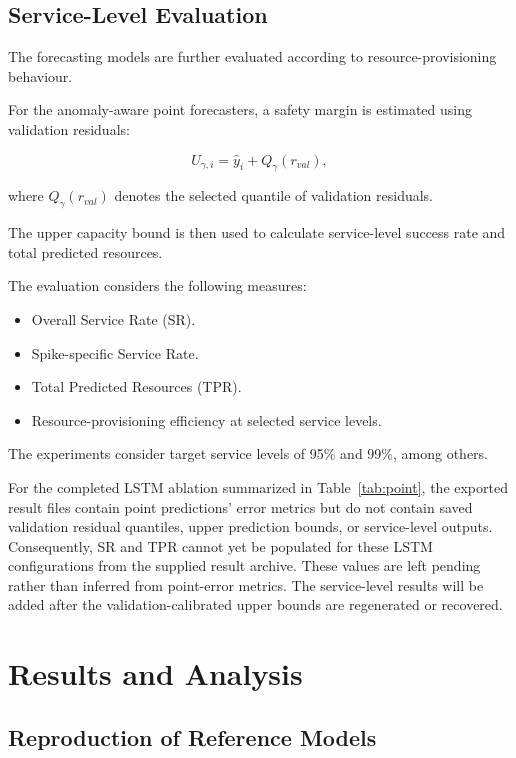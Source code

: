 \documentclass[conference]{IEEEtran}
\begin{document}
\subsection{Service-Level Evaluation}

The forecasting models are further evaluated according to resource-provisioning behaviour.

For the anomaly-aware point forecasters, a safety margin is estimated using validation residuals:

\begin{equation}
U_{\gamma,i}=\hat{y}_i+Q_{\gamma}(r_{val}),
\end{equation}

where $Q_{\gamma}(r_{val})$ denotes the selected quantile of validation residuals.

The upper capacity bound is then used to calculate service-level success rate and total predicted resources.

The evaluation considers the following measures:

\begin{itemize}
\item Overall Service Rate (SR).
\item Spike-specific Service Rate.
\item Total Predicted Resources (TPR).
\item Resource-provisioning efficiency at selected service levels.
\end{itemize}

The experiments consider target service levels of 95\% and 99\%, among others.

For the completed LSTM ablation summarized in Table~\ref{tab:point}, the exported result files contain point predictions' error metrics but do not contain saved validation residual quantiles, upper prediction bounds, or service-level outputs. Consequently, SR and TPR cannot yet be populated for these LSTM configurations from the supplied result archive. These values are left pending rather than inferred from point-error metrics. The service-level results will be added after the validation-calibrated upper bounds are regenerated or recovered.

\section{Results and Analysis}

\subsection{Reproduction of Reference Models}
\end{document}
